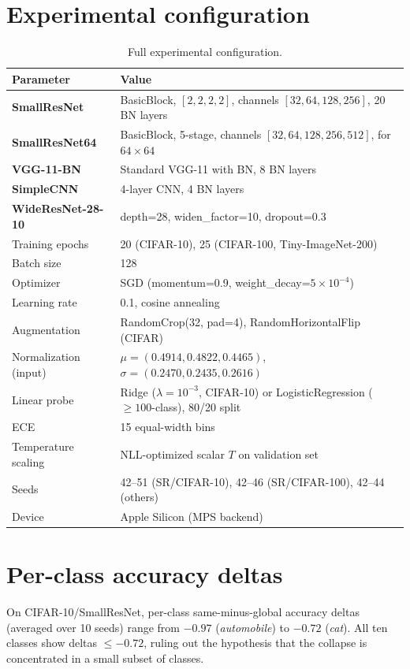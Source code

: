 \documentclass{article}
\begin{document}



\newpage
\appendix

\section{Experimental configuration}
\label{app:config}

\begin{table}[h]
\caption{Full experimental configuration.}
\label{tab:config}
\centering
\small
\begin{tabular}{@{}ll@{}}
\toprule
Parameter & Value \\
\midrule
\textbf{SmallResNet} & BasicBlock, $[2,2,2,2]$, channels $[32,64,128,256]$, 20 BN layers \\
\textbf{SmallResNet64} & BasicBlock, 5-stage, channels $[32,64,128,256,512]$, for $64{\times}64$ \\
\textbf{VGG-11-BN} & Standard VGG-11 with BN, 8 BN layers \\
\textbf{SimpleCNN} & 4-layer CNN, 4 BN layers \\
\textbf{WideResNet-28-10} & depth=28, widen\_factor=10, dropout=0.3 \\
Training epochs & 20 (CIFAR-10), 25 (CIFAR-100, Tiny-ImageNet-200) \\
Batch size & 128 \\
Optimizer & SGD (momentum=0.9, weight\_decay=$5{\times}10^{-4}$) \\
Learning rate & 0.1, cosine annealing \\
Augmentation & RandomCrop(32, pad=4), RandomHorizontalFlip (CIFAR) \\
Normalization (input) & $\mu{=}(0.4914, 0.4822, 0.4465)$, $\sigma{=}(0.2470, 0.2435, 0.2616)$ \\
Linear probe & Ridge ($\lambda{=}10^{-3}$, CIFAR-10) or LogisticRegression ($\geq 100$-class), 80/20 split \\
ECE & 15 equal-width bins \\
Temperature scaling & NLL-optimized scalar $T$ on validation set \\
Seeds & 42--51 (SR/CIFAR-10), 42--46 (SR/CIFAR-100), 42--44 (others) \\
Device & Apple Silicon (MPS backend) \\
\bottomrule
\end{tabular}
\end{table}

\section{Per-class accuracy deltas}
\label{app:perclass}
On CIFAR-10/SmallResNet, per-class same-minus-global accuracy deltas (averaged over 10 seeds) range from $-0.97$ (\emph{automobile}) to $-0.72$ (\emph{cat}). All ten classes show deltas $\leq -0.72$, ruling out the hypothesis that the collapse is concentrated in a small subset of classes.
\end{document}
